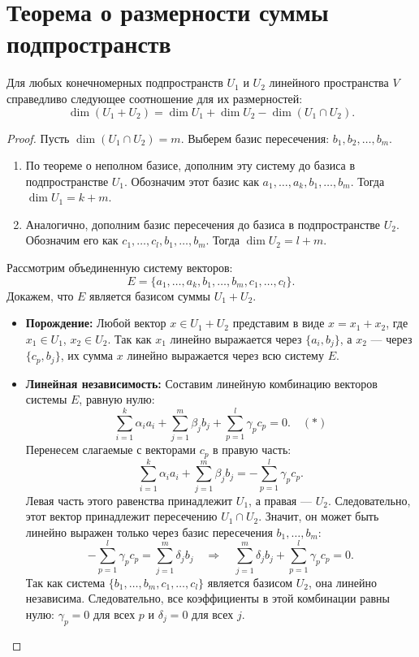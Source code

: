 \section{Теорема о размерности суммы подпространств}

\begin{theorem}
Для любых конечномерных подпространств $U_1$ и $U_2$ линейного пространства $V$ справедливо следующее соотношение для их размерностей:
\[
\dim(U_1 + U_2) = \dim U_1 + \dim U_2 - \dim(U_1 \cap U_2).
\]
\end{theorem}

\begin{proof}
Пусть $\dim(U_1 \cap U_2) = m$. Выберем базис пересечения: $b_1, b_2, \dots, b_m$.

\begin{enumerate}
    \item По теореме о неполном базисе, дополним эту систему до базиса в подпространстве $U_1$. Обозначим этот базис как $a_1, \dots, a_k, b_1, \dots, b_m$. Тогда $\dim U_1 = k + m$.
    \item Аналогично, дополним базис пересечения до базиса в подпространстве $U_2$. Обозначим его как $c_1, \dots, c_l, b_1, \dots, b_m$. Тогда $\dim U_2 = l + m$.
\end{enumerate}

Рассмотрим объединенную систему векторов:
\[
E = \{ a_1, \dots, a_k, b_1, \dots, b_m, c_1, \dots, c_l \}.
\]
Докажем, что $E$ является базисом суммы $U_1 + U_2$.

\begin{itemize}
    \item \textbf{Порождение:} Любой вектор $x \in U_1 + U_2$ представим в виде $x = x_1 + x_2$, где $x_1 \in U_1$, $x_2 \in U_2$. Так как $x_1$ линейно выражается через $\{a_i, b_j\}$, а $x_2$ --- через $\{c_p, b_j\}$, их сумма $x$ линейно выражается через всю систему $E$.
    
    \item \textbf{Линейная независимость:} Составим линейную комбинацию векторов системы $E$, равную нулю:
    \[
    \sum_{i=1}^k \alpha_i a_i + \sum_{j=1}^m \beta_j b_j + \sum_{p=1}^l \gamma_p c_p = 0. \quad (*)
    \]
    Перенесем слагаемые с векторами $c_p$ в правую часть:
    \[
    \sum_{i=1}^k \alpha_i a_i + \sum_{j=1}^m \beta_j b_j = - \sum_{p=1}^l \gamma_p c_p.
    \]
    Левая часть этого равенства принадлежит $U_1$, а правая --- $U_2$. Следовательно, этот вектор принадлежит пересечению $U_1 \cap U_2$. Значит, он может быть линейно выражен только через базис пересечения $b_1, \dots, b_m$:
    \[
    - \sum_{p=1}^l \gamma_p c_p = \sum_{j=1}^m \delta_j b_j \quad \Rightarrow \quad \sum_{j=1}^m \delta_j b_j + \sum_{p=1}^l \gamma_p c_p = 0.
    \]
    Так как система $\{b_1, \dots, b_m, c_1, \dots, c_l\}$ является базисом $U_2$, она линейно независима. Следовательно, все коэффициенты в этой комбинации равны нулю: $\gamma_p = 0$ для всех $p$ и $\delta_j = 0$ для всех $j$.
    

\end{itemize}
\end{proof}
